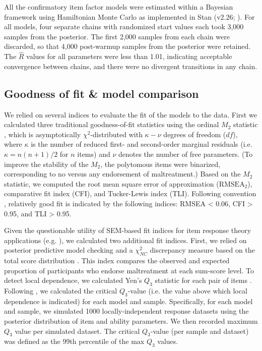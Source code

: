 \documentclass[letterpaper,man,natbib]{apa6}  %
\begin{document}
All the confirmatory item factor models were estimated within a Bayesian framework using Hamiltonian Monte Carlo as implemented in Stan (v2.26; \citealt{carpenter2017stan}). For all models, four separate chains with randomized start values each took 3,000 samples from the posterior. The first 2,000 samples from each chain were discarded, so that 4,000 post-warmup samples from the posterior were retained. The $\hat{R}$ values for all parameters were less than 1.01, indicating acceptable convergence between chains, and there were no divergent transitions in any chain. 

\subsection{Goodness of fit \& model comparison}

We relied on several indices to evaluate the fit of the models to the data. First we calculated three traditional goodness-of-fit statistics using the ordinal $M_2$ statistic \citep{cai2013limited, maydeu2013goodness}, which is asymptotically $\chi^2$-distributed with $\kappa − \nu$ degrees of freedom ($df$), where $\kappa$ is the number of reduced first- and second-order marginal residuals (i.e. $\kappa = n(n + 1)/2$ for $n$ items) and $\nu$ denotes the number of free parameters. (To improve the stability of the $M_2$, the polytomous items were binarized, corresponding to no versus any endorsement of maltreatment.)  Based on the $M_2$ statistic, we computed the root mean square error of approximation ($\text{RMSEA}_2$), comparative fit index (CFI), and Tucker-Lewis index (TLI). Following convention \citep{hu1999cutoff}, relatively good fit is indicated by the following indices: RMSEA < 0.06, CFI > 0.95, and TLI > 0.95. 

Given the questionable utility of SEM-based fit indices for item response theory applications (e.g. \citealt{reise2014evaluating}), we calculated two additional fit indices. First, we relied on posterior predictive model checking and a $\chi^2_{NC}$ discrepancy measure based on the total score distribution \citep{sinharay2006posterior}. This index compares the observed and expected proportion of participants who endorse maltreatment at each sum-score level. To detect local dependence, we calculated Yen's $Q_3$ statistic for each pair of items \citep{yen1984effects}. Following \cite{christensen2017critical}, we calculated the critical $Q_3$-value (i.e. the value above which local dependence is indicated) for each model and sample. Specifically, for each model and sample, we simulated 1000 locally-independent response datasets using the posterior distribution of item and ability parameters. We then recorded maximum $Q_3$ value per simulated dataset. The critical $Q_3$-value (per sample and dataset) was defined as the 99th percentile of the max $Q_3$ values.
\end{document}
